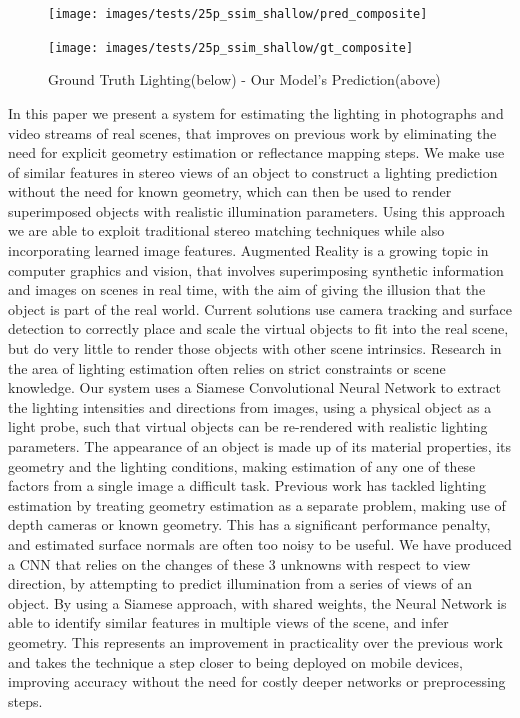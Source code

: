 \documentclass[ %
                    author={Gavin Parker},
                supervisor={Dr. Neill Campbell},
                    degree={MEng},
                     title={Deep Siamese Networks for Illumination Estimation from Stereo Images},
                  subtitle={},
                      type={Research},
                      year={2018} ]{dissertation}
\begin{document}
\begin{figure}[H]
\centering
\texttt{[image: images/tests/25p\_ssim\_shallow/pred\_composite]}

\vspace{0.5cm}
\texttt{[image: images/tests/25p\_ssim\_shallow/gt\_composite]}

\caption{Ground Truth Lighting(below) - Our Model's Prediction(above) }
\label{example_1}
\end{figure}
\noindent
In this paper we present a system for estimating the lighting in photographs and video streams of real scenes, that improves on previous work by eliminating the need for explicit geometry estimation or reflectance mapping steps. We make use of similar features in stereo views of an object to construct a lighting prediction without the need for known geometry, which can then be used to render superimposed objects with realistic illumination parameters. Using this approach we are able to exploit traditional stereo matching techniques while also incorporating learned image features.
\newline
Augmented Reality is a growing topic in computer graphics and vision, that involves superimposing synthetic information and images on scenes in real time, with the aim of giving the illusion that the object is part of the real world. Current solutions use camera tracking and surface detection to correctly place and scale the virtual objects to fit into the real scene, but do very little to render those objects with other scene intrinsics. Research in the area of lighting estimation often relies on strict constraints or scene knowledge. Our system uses a Siamese Convolutional Neural Network to extract the lighting intensities and directions from images, using a physical object as a light probe, such that virtual objects can be re-rendered with realistic lighting parameters.
\newline
The appearance of an object is made up of its material properties, its geometry and the lighting conditions, making estimation of any one of these factors from a single image a difficult task. Previous work has tackled lighting estimation by treating geometry estimation as a separate problem, making use of depth cameras or known geometry. This has a significant performance penalty, and estimated surface normals are often too noisy to be useful. We have produced a CNN that relies on the changes of these 3 unknowns with respect to view direction, by attempting to predict illumination from a series of views of an object. By using a Siamese approach, with shared weights, the Neural Network is able to identify similar features in multiple views of the scene, and infer geometry. This represents an improvement in practicality over the previous work and takes the technique a step closer to being deployed on mobile devices, improving accuracy without the need for costly deeper networks or preprocessing steps.
\end{document}
